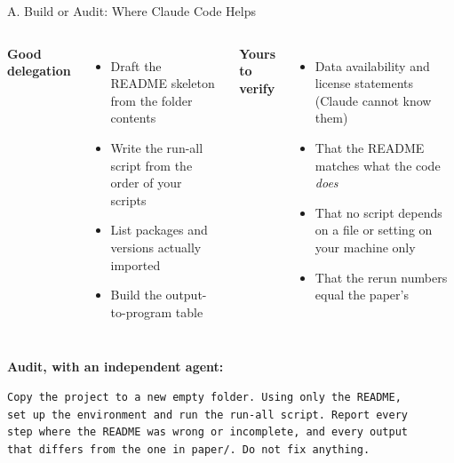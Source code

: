 \documentclass[aspectratio=169, 11pt]{beamer}
\begin{document}
\begin{frame}[fragile]{A. Build or Audit: Where Claude Code Helps}
  \begin{columns}[T]
    \textbf{Good delegation}
    \begin{itemize}\small
      \item Draft the README skeleton from the folder contents
      \item Write the run-all script from the order of your scripts
      \item List packages and versions actually imported
      \item Build the output-to-program table
    \end{itemize}

    \textbf{Yours to verify}
    \begin{itemize}\small
      \item Data availability and license statements (Claude cannot know them)
      \item That the README matches what the code \emph{does}
      \item That no script depends on a file or setting on your machine only
      \item That the rerun numbers equal the paper's
    \end{itemize}
  \end{columns}

  \vspace{0.5em}
  \textbf{Audit, with an independent agent:}
  \begin{lstlisting}[basicstyle=\ttfamily\scriptsize]
Copy the project to a new empty folder. Using only the README,
set up the environment and run the run-all script. Report every
step where the README was wrong or incomplete, and every output
that differs from the one in paper/. Do not fix anything.
  \end{lstlisting}
\end{frame}
\end{document}
